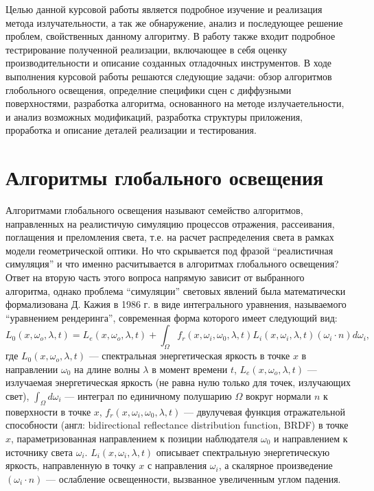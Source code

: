 \documentclass[12pt]{article}
\begin{document}
Целью данной курсовой работы является подробное изучение и реализация метода излучательности, а так же обнаружение, анализ и последующее решение проблем, свойственных данному алгоритму. В работу также входит подробное тестрирование полученной реализации, включающее в себя оценку производительности и описание созданных отладочных инструментов. В ходе выполнения курсовой работы решаются следующие задачи: обзор алгоритмов глобольного освещения, определние специфики сцен с диффузными поверхностями, разработка алгоритма, основанного на методе излучаетельности, и анализ возможных модификаций, разработка структуры приложения, проработка и описание деталей реализации и тестирования.
\newpage\section{Алгоритмы глобального освещения}
Алгоритмами глобального освещения называют семейство алгоритмов, направленных на реалистичую симуляцию процессов отражения, рассеивания, поглащения и преломления света, т.е. на расчет распределения света в рамках модели геометрической оптики. Но что скрывается под фразой ``реалистичная симуляция'' и что именно расчитывается в алгоритмах глобального освещения? Ответ на вторую часть этого вопроса напрямую зависит от выбранного алгоритма, однако проблема ``симуляции'' световых явлений была математически формализована Д. Кажия в 1986 г. \cite{Kaj86} в виде интегрального уравнения, называемого ``уравнением рендеринга'', современная форма которого имеет следующий вид:
\begin{equation}
L_0(x, \omega_o, \lambda, t) = L_e(x, \omega_o, \lambda, t) + \int_\Omega f_r(x, \omega_i, \omega_0, \lambda, t) L_i(x, \omega_i, \lambda, t) (\omega_i \cdot n) d\omega_i, \label{eq:kaj}
\end{equation}
где $L_0(x, \omega_o, \lambda, t)$ --- спектральная энергетическая яркость в точке $x$ в направлении $\omega_0$ на длине волны $\lambda$ в момент времени $t$, $L_e(x, \omega_o, \lambda, t)$ --- излучаемая энергетическая яркость (не равна нулю только для точек, излучающих свет), $\int_\Omega d\omega_i$ --- интеграл по единичному полушарию $\Omega$ вокруг нормали $n$ к поверхности в точке $x$, $f_r(x, \omega_i, \omega_0, \lambda, t)$ --- двулучевая функция отражательной способности (англ: bidirectional reflectance distribution function, BRDF) в точке $x$, параметризованная направлением к позиции наблюдателя $\omega_0$ и направлением к источнику света $\omega_i$. $L_i(x, \omega_i, \lambda, t)$ описывает спектральную энергетическую яркость, направленную в точку $x$ с направления $\omega_i$, а скалярное произведение $(\omega_i \cdot n)$ --- ослабление освещенности, вызванное увеличенным углом падения.
\end{document}
